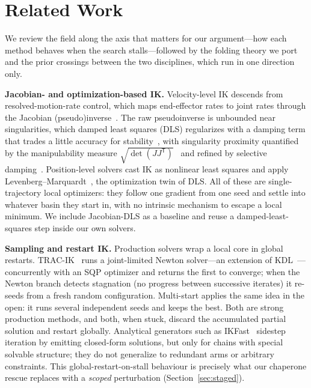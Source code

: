 \documentclass[10pt,conference]{IEEEtran}
\newcommand{\tp}{^{\mathsf{T}}}                       %
\begin{document}
\section{Related Work}
\label{sec:related}

We review the field along the axis that matters for our argument---how each
method behaves when the search stalls---followed by the folding theory we port
and the prior crossings between the two disciplines, which run in one direction
only.

\textbf{Jacobian- and optimization-based IK.} Velocity-level IK descends from
resolved-motion-rate control, which maps end-effector rates to joint rates
through the Jacobian (pseudo)inverse~\cite{b2}. The raw pseudoinverse is
unbounded near singularities, which damped least squares (DLS) regularizes with
a damping term that trades a little accuracy for stability~\cite{b3,b4}, with
singularity proximity quantified by the manipulability measure
$\sqrt{\det(JJ\tp)}$~\cite{b5} and refined by selective damping~\cite{b6}.
Position-level solvers cast IK as nonlinear least squares and apply
Levenberg--Marquardt~\cite{b7,b8}, the optimization twin of DLS. All of these
are single-trajectory local optimizers: they follow one gradient from one seed
and settle into whatever basin they start in, with no intrinsic mechanism to
escape a local minimum. We include Jacobian-DLS as a baseline and reuse a
damped-least-squares step inside our own solvers.

\textbf{Sampling and restart IK.} Production solvers wrap a local core in global
restarts. TRAC-IK~\cite{b9} runs a joint-limited Newton solver---an extension of
KDL~\cite{b10}---concurrently with an SQP optimizer and returns the first to
converge; when the Newton branch detects stagnation (no progress between
successive iterates) it re-seeds from a fresh random configuration. Multi-start
applies the same idea in the open: it runs several independent seeds and keeps
the best. Both are strong production methods, and both, when stuck, discard the
accumulated partial solution and restart globally. Analytical generators such as
IKFast~\cite{b11} sidestep iteration by emitting closed-form solutions, but only
for chains with special solvable structure; they do not generalize to redundant
arms or arbitrary constraints. This global-restart-on-stall behaviour is
precisely what our chaperone rescue replaces with a \emph{scoped} perturbation
(Section~\ref{sec:staged}).
\end{document}
